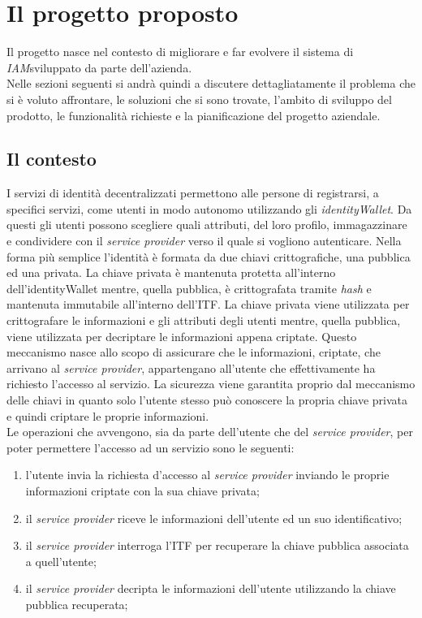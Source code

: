 \section{Il progetto proposto}
Il progetto nasce nel contesto di migliorare e far evolvere il sistema di \emph{\gls{IAM}}\glsfirstoccur sviluppato da parte dell'azienda.\\
Nelle sezioni seguenti si andrà quindi a discutere dettagliatamente il problema che si è voluto affrontare, le soluzioni che si sono trovate, l'ambito di sviluppo del prodotto, le funzionalità richieste e la pianificazione del progetto aziendale.

\subsection{Il contesto}
I servizi di identità decentralizzati permettono alle persone di registrarsi, a specifici servizi, come utenti in modo autonomo utilizzando gli \emph{\gls{identityWallet}}\glsfirstoccur. 
Da questi gli utenti possono scegliere quali attributi, del loro profilo, immagazzinare e condividere con il \textit{service provider} verso il quale si vogliono autenticare.
Nella forma più semplice l'identità è formata da due chiavi crittografiche, una pubblica ed una privata.
La chiave privata è mantenuta protetta all'interno dell'\gls{identityWallet} mentre, quella pubblica, è crittografata tramite \textit{hash} e mantenuta immutabile all'interno dell'\gls{ITF}. 
La chiave privata viene utilizzata per crittografare le informazioni e gli attributi degli utenti mentre, quella pubblica, viene utilizzata per decriptare le informazioni appena criptate. Questo meccanismo nasce allo scopo di assicurare che le informazioni, criptate, che arrivano al \textit{service provider}, appartengano all'utente che effettivamente ha richiesto l'accesso al servizio. La sicurezza viene garantita proprio dal meccanismo delle chiavi in quanto solo l'utente stesso può conoscere la propria chiave privata e quindi criptare le proprie informazioni.\\
Le operazioni che avvengono, sia da parte dell'utente che del \textit{service provider}, per poter permettere l'accesso ad un servizio sono le seguenti:
\begin{enumerate}
	\item l'utente invia la richiesta d'accesso al \textit{service provider} inviando le proprie informazioni criptate con la sua chiave privata;
	\item il \textit{service provider} riceve le informazioni dell'utente ed un suo identificativo;
	\item il \textit{service provider} interroga l'\gls{ITF} per recuperare la chiave pubblica associata a quell'utente;
	\item il \textit{service provider} decripta le informazioni dell'utente utilizzando la chiave pubblica recuperata;
\end{enumerate}
